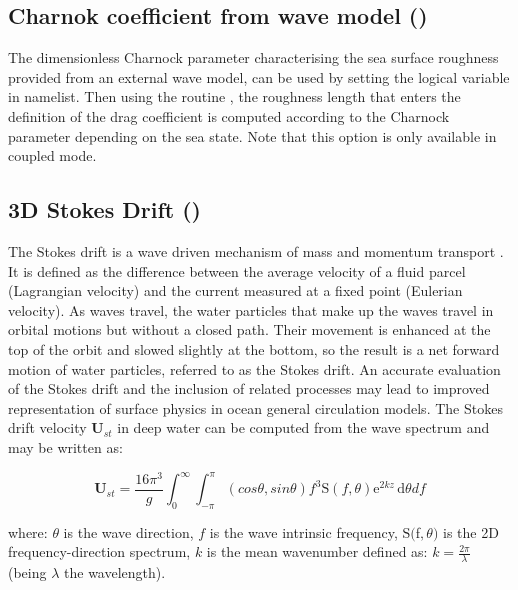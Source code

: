 \documentclass[../main/NEMO_manual]{subfiles}
\begin{document}
\subsection[Charnok coefficient from wave model (\forcode{ln_charn})]{ Charnok coefficient from wave model (\protect{})}
\label{subsec:SBC_wave_charn}

The dimensionless Charnock parameter characterising the sea surface roughness provided from an external wave model, can be used by setting the logical variable  in  namelist. Then using the routine , the roughness length that enters the definition of the drag coefficient is computed according to the Charnock parameter depending on the sea state.
Note that this option is only available in coupled mode.\\



\subsection[3D Stokes Drift (\forcode{ln_sdw})]{3D Stokes Drift (\protect{}) }
\label{subsec:SBC_wave_sdw}

The Stokes drift is a wave driven mechanism of mass and momentum transport \citep{stokes_ibk09}.
It is defined as the difference between the average velocity of a fluid parcel (Lagrangian velocity)
and the current measured at a fixed point (Eulerian velocity).
As waves travel, the water particles that make up the waves travel in orbital motions but
without a closed path. Their movement is enhanced at the top of the orbit and slowed slightly
at the bottom, so the result is a net forward motion of water particles, referred to as the Stokes drift.
An accurate evaluation of the Stokes drift and the inclusion of related processes may lead to improved
representation of surface physics in ocean general circulation models. %
The Stokes drift velocity $\mathbf{U}_{st}$ in deep water can be computed from the wave spectrum and may be written as:

\[
  \mathbf{U}_{st} = \frac{16{\pi^3}} {g}
  \int_0^\infty \int_{-\pi}^{\pi} (cos{\theta},sin{\theta}) {f^3}
  \mathrm{S}(f,\theta) \mathrm{e}^{2kz}\,\mathrm{d}\theta {d}f
\]

where: ${\theta}$ is the wave direction, $f$ is the wave intrinsic frequency,
$\mathrm{S}($f$,\theta)$ is the 2D frequency-direction spectrum,
$k$ is the mean wavenumber defined as:
$k=\frac{2\pi}{\lambda}$ (being $\lambda$ the wavelength). \\
\end{document}
